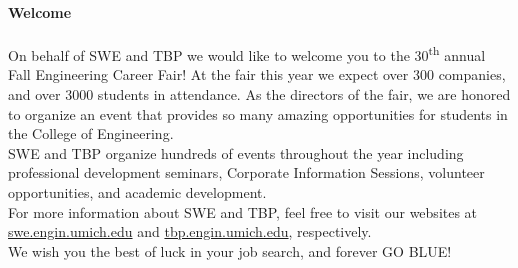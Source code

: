 \documentclass[twoside]{article}
\begin{document}
    
    \startforewardsection
    { \fontsize{16}{19}\selectfont \bf Welcome}\\~\\On behalf of SWE and TBP we would like to welcome you to the 30\textsuperscript{th} annual Fall Engineering Career Fair! At the fair this year we expect over 300 companies, and over 3000 students in attendance. As the directors of the fair, we are honored to organize an event that provides so many amazing opportunities for students in the College of Engineering. 
~\\

    SWE and TBP organize hundreds of events throughout the year including professional development seminars, Corporate Information Sessions, volunteer opportunities, and academic development. 
~\\

    For more information about SWE and TBP, feel free to visit our websites at \url{swe.engin.umich.edu} and \url{tbp.engin.umich.edu}, respectively.
~\\

    We wish you the best of luck in your job search, and forever GO BLUE!
~\\
\end{document}
